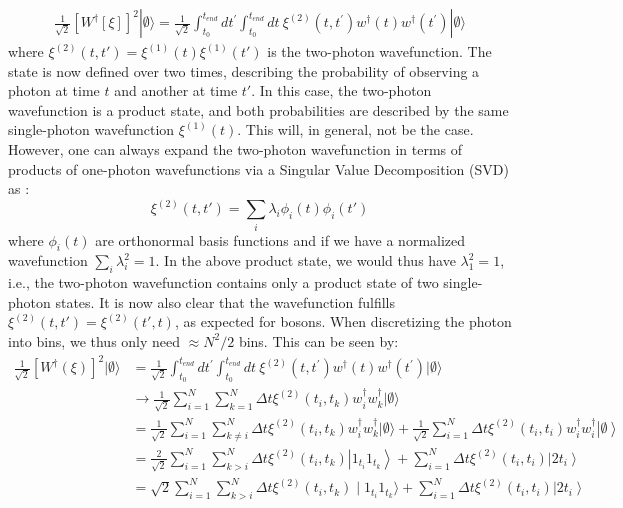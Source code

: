 \begin{align}
\frac{1}{\sqrt{2}}\left[W^\dagger[\xi]\right]^2| \emptyset \rangle = \frac{1}{\sqrt{2}} \int_{t_0}^{t_{end}} d t^{\prime} \int_{t_0}^{t_{end}} d t \ \xi^{(2)}(t,t^{\prime}) w^\dagger(t) w^\dagger\left(t^{\prime}\right)|\emptyset \rangle  
\end{align}
where $\xi^{(2)}(t,t') = \xi^{(1)}(t)\xi^{(1)}(t')$ is the two-photon wavefunction. The state is now defined over two times, describing the probability of observing a photon at time $t$ and another at time $t'$. In this case, the two-photon wavefunction is a product state, and both probabilities are described by the same single-photon wavefunction $\xi^{(1)}(t)$. This will, in general, not be the case. However, one can always expand the two-photon wavefunction in terms of products of one-photon wavefunctions via a Singular Value Decomposition (SVD) as \cite{Yang2022DeterministicSystems}:
\begin{equation}
    \xi^{(2)}(t,t') = \sum_i \lambda_i \phi_i(t) \phi_i(t') \label{eq:SVD}
\end{equation}
where $\phi_i(t)$ are orthonormal basis functions and if we have a normalized wavefunction $\sum_i\lambda_i^2 = 1$. In the above product state, we would thus have $\lambda_1^2 = 1$, i.e., the two-photon wavefunction contains only a product state of two single-photon states. It is now also clear that the wavefunction fulfills $\xi^{(2)}(t,t') = \xi^{(2)}(t',t)$, as expected for bosons. When discretizing the photon into bins, we thus only need $\approx N^2/2$ bins. This can be seen by:
\begin{align}
\frac{1}{\sqrt{2}} \left[W^\dagger(\xi)\right]^2|\emptyset \rangle &= \frac{1}{\sqrt{2}} \int_{t_0}^{t_{end}} d t^{\prime} \int_{t_0}^{t_{end}} d t \ \xi^{(2)}(t,t^{\prime}) w^\dagger(t) w^\dagger\left(t^{\prime}\right)|\emptyset \rangle \\
& \rightarrow \frac{1}{\sqrt{2}} \sum_{i=1}^N \sum_{k=1}^N   \Delta t \xi^{(2)} \left (t_i,t_k\right ) w_i^\dagger w_k^{\dagger}|\emptyset\rangle \\
& = \frac{1}{\sqrt{2}} \sum_{i=1}^N \sum_{k \neq i}^N \Delta t \xi^{(2)} \left (t_i,t_k\right) w_i^{\dagger} w_k^{\dagger}|\emptyset\rangle + \frac{1}{\sqrt{2}} \sum_{i=1}^N \Delta t \xi^{(2)} \left (t_i,t_i\right )w_i^\dagger w_i^\dagger\left|\emptyset\right\rangle \\
& =\frac{2}{\sqrt{2}} \sum_{i=1}^N \sum_{k>i}^N \Delta t \xi^{(2)} \left (t_i,t_k\right )\left|1_{t_i} 1_{t_k}\right\rangle + \sum_{i=1}^N \Delta t \xi^{(2)} \left (t_i,t_i\right ) \left|2 t_i\right\rangle \\
& =\sqrt{2} \sum_{i=1}^N \sum_{k > i}^N \Delta t \xi^{(2)}\left (t_i,t_k\right ) \mid 1_{t_i} 1_{t_k}\rangle + \sum_{i=1}^N \Delta t \xi^{(2)}\left (t_i,t_i\right )\left|2 t_i\right\rangle
\end{align}
